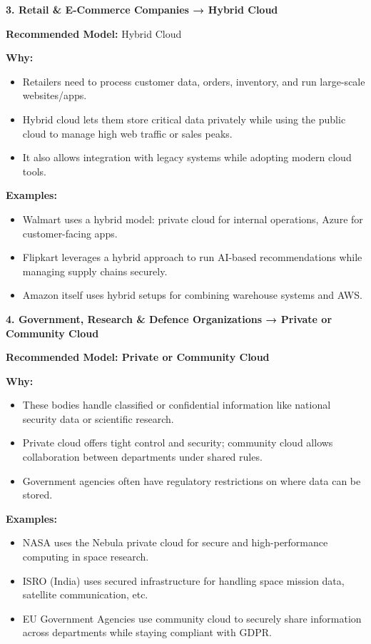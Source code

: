\documentclass[12pt]{article}
\begin{document}
\textbf{3. Retail \& E-Commerce Companies → Hybrid Cloud}

\textbf{Recommended Model:} Hybrid Cloud

\textbf{Why:}

\begin{itemize}
\item
  Retailers need to process customer data, orders, inventory, and run
  large-scale websites/apps.
\item
  Hybrid cloud lets them store critical data privately while using the
  public cloud to manage high web traffic or sales peaks.
\item
  It also allows integration with legacy systems while adopting modern
  cloud tools.
\end{itemize}

\textbf{Examples:}

\begin{itemize}
\item
  Walmart uses a hybrid model: private cloud for internal operations,
  Azure for customer-facing apps.
\item
  Flipkart leverages a hybrid approach to run AI-based recommendations
  while managing supply chains securely.
\item
  Amazon itself uses hybrid setups for combining warehouse systems and
  AWS.
\end{itemize}

\textbf{4. Government, Research \& Defence Organizations → Private or
Community Cloud}

\textbf{Recommended Model: Private or Community Cloud}

\textbf{Why:}

\begin{itemize}
\item
  These bodies handle classified or confidential information like
  national security data or scientific research.
\item
  Private cloud offers tight control and security; community cloud
  allows collaboration between departments under shared rules.
\item
  Government agencies often have regulatory restrictions on where data
  can be stored.
\end{itemize}

\textbf{Examples:}

\begin{itemize}
\item
  NASA uses the Nebula private cloud for secure and high-performance
  computing in space research.
\item
  ISRO (India) uses secured infrastructure for handling space mission
  data, satellite communication, etc.
\item
  EU Government Agencies use community cloud to securely share
  information across departments while staying compliant with GDPR.
\end{itemize}
\end{document}
